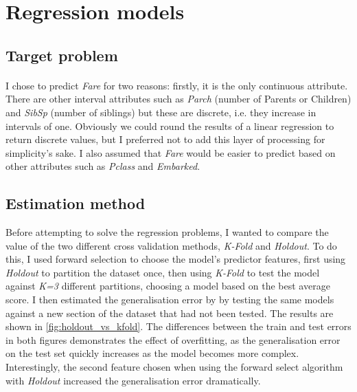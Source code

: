 \documentclass[a4paper]{scrartcl}
\begin{document}
\section{Regression models}
\subsection{Target problem}
\paragraph{}
I chose to predict \emph{Fare} for two reasons: firstly, it is the only continuous attribute. There are other interval attributes such as \emph{Parch} (number of Parents or Children) and \emph{SibSp} (number of siblings) but these are discrete, i.e. they increase in intervals of one. Obviously we could round the results of a linear regression to return discrete values, but I preferred not to add this layer of processing for simplicity's sake. I also assumed that \emph{Fare} would be easier to predict based on other attributes such as \emph{Pclass} and \emph{Embarked}.

\subsection{Estimation method}
Before attempting to solve the regression problems, I wanted to compare the value of the two different cross validation methods, \emph{K-Fold} and \emph{Holdout}. To do this, I used forward selection to choose the model's predictor features, first using \emph{Holdout} to partition the dataset once, then using \emph{K-Fold} to test the model against \emph{K=3} different partitions, choosing a model based on the best average score. I then estimated the generalisation error by by testing the same models against a new section of the dataset that had not been tested. The results are shown in \ref{fig:holdout_vs_kfold}. The differences between the train and test errors in both figures demonstrates the effect of overfitting, as the generalisation error on the test set quickly increases as the model becomes more complex. Interestingly, the second feature chosen when using the forward select algorithm with \emph{Holdout} increased the generalisation error dramatically.  
\end{document}
